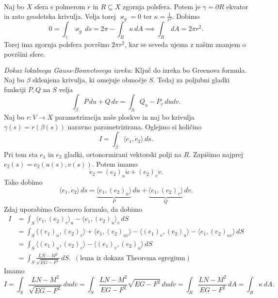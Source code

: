 \begin{primer}
    Naj bo $X$ sfera s polmerom $r$ in $R \subseteq  X$ zgornja polsfera. Potem je $\gamma = \partial R$ ekvator in zato geodetska krivulja. Velja torej $\varkappa_g = 0$ ter $\kappa = \frac{1}{r^2}$. Dobimo \begin{equation*}
    0 = \int_{\gamma} \varkappa_g  \, ds = 2 \pi - \int_{R} \kappa  \, dA \implies \int_{R}  \, dA =  2 \pi r^2.
    \end{equation*}  
    Torej ima zgornja polsfera površino $2 \pi r^2$, kar se seveda ujema z našim znanjem o površini sfere.
\end{primer}

\noindent
{\em Dokaz lokalnega Gauss-Bonnetovega izreka:\/}
Ključ do izreka bo Greenova formula. Naj bo $\beta$ sklenjena krivulja, ki omejuje območje $S$. Tedaj za poljubni gladki funkciji $P, Q$ na $S$ velja \begin{equation*}
\int_{\beta} P \, du  + Q \, dv = \int_{S} Q_u - P_v \, du dv.
\end{equation*}  
Naj bo $r: V \to  X$ parametrizacija naše ploskve in naj bo krivulja $\gamma(s) = r(\beta(s))$ naravno parametrizirana. Oglejmo si količino \begin{equation*}
I = \int_{\beta} \langle e_1, \dot{e}_2 \rangle   \, ds.
\end{equation*}  
Pri tem sta  $e_1$ in $e_2$ gladki, ortonormirani vektorski polji na $R$. Zapišimo najprej $e_2(s) = e_2(u(s), v(s))$. Potem imamo \begin{equation*}
\dot{e}_2 = (e_2)_u \dot{u} + (e_2)_v \dot{v}.
\end{equation*}  
Tako dobimo \begin{equation*}
\langle e_1, \dot{e}_2 \rangle \, ds  = \underbrace{\langle e_1, (e_2)_u \rangle}_P  \, du +  \underbrace{\langle e_1, (e_2)_v \rangle}_Q  \, dv.
\end{equation*}  
Zdaj uporabimo Greenovo formulo, da dobimo \begin{align*}
    I &= \int_{S} \langle e_1, (e_2)_v \rangle_u - \langle e_1, (e_2)_u \rangle_v   \, dS  \\
     &= \int_{S} \langle (e_1)_u, (e_2)_v \rangle + \langle e_1, (e_2)_{uv} \rangle - \langle (e_1)_v, (e_2)_u \rangle   - \langle e_1, (e_2)_{uv} \rangle \, dS \\
     &=  \int_{S} \langle (e_1)_u, (e_2)_v \rangle - \langle (e_1)_v, (e_2)_u \rangle  \, dS \\
     &= \int_{S} \frac{LN - M^2}{\sqrt{EG - F^2} }  \, dS. \,\,\,(\text{lema iz dokaza Theorema egregium})
\end{align*}
Imamo \begin{equation*}
I = \int_{S} \frac{LN - M^2}{\sqrt{EG - F^2} }  \, du dv =  \int_{S} \frac{LN - M^2}{EG - F^2} \sqrt{EG - F^2}  \, du dv = \int_{R} \frac{LN - M^2}{EG - F^2} \, dA = \int_{R} \kappa \, dA.
\end{equation*}  

